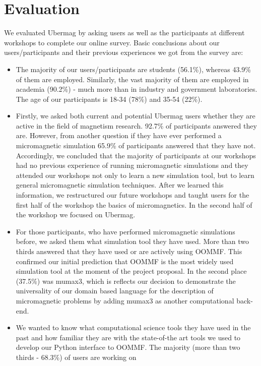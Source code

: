\documentclass{deliverablereport}
\begin{document}
\section{Evaluation}

We evaluated Ubermag by asking users as well as the participants at
different workshops to complete our online survey. Basic conclusions
about our users/participants and their previous experiences we got
from the survey are:

\begin{itemize}
  \item The majority of our users/participants are students (56.1\%),
whereas 43.9\% of them are employed. Similarly, the vast majority of
them are employed in academia (90.2\%) - much more than in industry
and government laboratories. The age of our participants is 18-34 (78\%) and
35-54 (22\%).
\item Firstly, we asked both current and potential Ubermag users
whether they are active in the field of magnetism research. 92.7\% of
participants answered they are. However, from another question if they
have ever performed a micromagnetic simulation 65.9\% of participants
answered that they have not. Accordingly, we concluded that the
majority of participants at our workshops had no previous experience
of running micromagnetic simulations and they attended our workshops
not only to learn a new simulation tool, but to learn general
micromagnetic simulation techniques. After we learned this
information, we restructured our future workshops and taught users for
the first half of the workshop the basics of micromagnetics. In the
second half of the workshop we focused on Ubermag.
\item For those participants, who have performed micromagnetic
simulations before, we asked them what simulation tool they have
used. More than two thirds answered that they have used or are
actively using OOMMF. This confirmed our initial prediction that OOMMF
is the most widely used simulation tool at the moment of the project
proposal. In the second place (37.5\%) was mumax3, which is reflects
our decision to demonstrate the universality of our domain
based language for the description of micromagnetic problems by adding
mumax3 as another computational back-end.
\item We wanted to know what computational science tools they
have used in the past and how familiar they are with the state-of-the
art tools we used to develop our Python interface to OOMMF. The
majority (more than two thirds - 68.3\%) of users are working on

\end{itemize}
\end{document}
